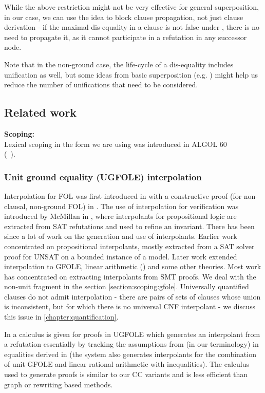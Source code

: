While the above restriction might not be very effective for general superposition, in our case, we can use the idea to block clause propagation, not just clause derivation - 
if the maximal dis-equality in a clause is not false under , there is no need to propagate it, as it cannot participate in a refutation in any successor node.

Note that in the non-ground case, the life-cycle of a dis-equality includes unification as well, but some ideas from basic superposition (e.g. \cite{DBLP:conf/esop/NieuwenhuisR92}) might help us reduce the number of unifications that need to be considered.



\subsection{Related work}
\textbf{Scoping:}\\
Lexical scoping in the form we are using was introduced in ALGOL 60 \\
(~\cite{DBLP:journals/cacm/BackusBGKMPRSVWWW60}).

\subsubsection*{Unit ground equality (UGFOLE) interpolation}
Interpolation for FOL was first introduced in \cite{Craig57a} with a constructive proof (for non-clausal, non-ground FOL) in \cite{lyndon1959}.
The use of interpolation for verification was introduced by McMillan in 
\cite{DBLP:conf/cav/McMillan03}, where interpolants for propositional logic are extracted from SAT refutations and used to refine an invariant. There has been since a lot of work on the generation and use of interpolants.
Earlier work concentrated on propositional interpolants, mostly extracted from a SAT solver proof for UNSAT on a bounded instance of a model.
Later work extended interpolation to GFOLE, linear arithmetic  (\cite{McMillan05}) and some other theories.
Most work has concentrated on extracting interpolants from SMT proofs.
We deal with the non-unit fragment in the section \ref{section:scoping:gfole}. Universally quantified clauses do not admit interpolation - there are pairs of sets of clauses whose union is inconsistent, but for which there is no universal CNF interpolant - we discuss this issue in \ref{chapter:quantification}.

In \cite{McMillan05} a calculus is given for proofs in UGFOLE which generates an interpolant from a refutation essentially by tracking the assumptions from (in our terminology)  in equalities derived in  (the system also generates interpolants for the combination of unit GFOLE and linear rational arithmetic with inequalities). The calculus used to generate proofs is similar to our CC variants and is less efficient than graph or rewriting based methods.

